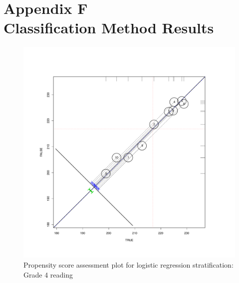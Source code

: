\clearpage
{}
\section*{Appendix F\\Classification Method Results}

\begin{figure}[h!]
\begin{center}
\includegraphics[height=.4\textheight,width=.4\textheight]{../Figures2009/g4read-circpsa10.pdf}
\caption{Propensity score assessment plot for logistic regression stratification: Grade 4 reading}
\end{center}
\end{figure}



